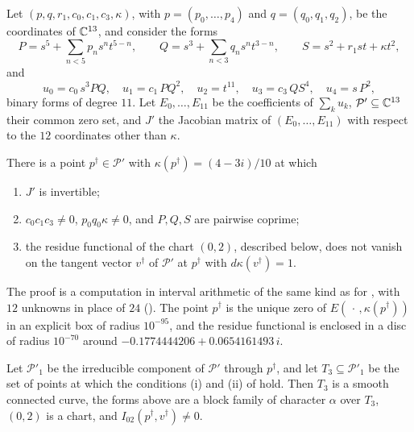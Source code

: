 Let $(p,q,r_{1},c_{0},c_{1},c_{3},\kappa)$, with $p=(p_{0},\dots,p_{4})$ and
$q=(q_{0},q_{1},q_{2})$, be the coordinates of $\mathbb{C}^{13}$, and consider the
forms
\[
  P=s^{5}+\sum_{n<5}p_{n}s^{n}t^{5-n},\qquad Q=s^{3}+\sum_{n<3}q_{n}s^{n}
  t^{3-n},\qquad S=s^{2}+r_{1}st+\kappa t^{2},
\]
and
\[
  u_{0}=c_{0}\,s^{3}PQ,\quad u_{1}=c_{1}\,PQ^{2},\quad u_{2}=t^{11},\quad
  u_{3}=c_{3}\,QS^{4},\quad u_{4}=s\,P^{2},
\]
binary forms of degree $11$. Let $E_{0},\dots,E_{11}$ be the coefficients
of $\sum_{k}u_{k}$, $\mathcal P'\subseteq\mathbb{C}^{13}$ their common zero set, and
$J'$ the Jacobian matrix of $(E_{0},\dots,E_{11})$ with respect to the $12$
coordinates other than $\kappa$.

\begin{proposition}\label{prop:family44}
There is a point $p^{\dagger}\in\mathcal P'$ with $\kappa(p^{\dagger})=
(4-3i)/10$ at which
\begin{enumerate}[label=\textup{(\roman*)}]
\item $J'$ is invertible;
\item $c_{0}c_{1}c_{3}\ne0$, $p_{0}q_{0}\kappa\ne0$, and $P,Q,S$ are
pairwise coprime;
\item the residue functional of the chart $(0,2)$, described below, does not
vanish on the tangent vector $v^{\dagger}$ of $\mathcal P'$ at $p^{\dagger}$
with $d\kappa(v^{\dagger})=1$.
\end{enumerate}
\end{proposition}

The proof is a computation in interval arithmetic of the same kind as for
, with $12$ unknowns in place of $24$
(). The point $p^{\dagger}$ is the unique zero of
$E(\,\cdot\,,\kappa(p^{\dagger}))$ in an explicit box of radius $10^{-95}$,
and the residue functional is enclosed in a disc of radius $10^{-70}$ around
$-0.1774444206+0.0654161493\,i$.

\begin{corollary}\label{cor:family44}
Let $\mathcal P'_{1}$ be the irreducible component of $\mathcal P'$ through
$p^{\dagger}$, and let $T_{3}\subseteq\mathcal P'_{1}$ be the set of points
at which the conditions \textup{(i)} and \textup{(ii)} of
 hold. Then $T_{3}$ is a smooth connected curve, the
forms above are a block family of character $\alpha$ over $T_{3}$, $(0,2)$
is a chart, and $I_{02}(p^{\dagger},v^{\dagger})\ne0$.
\end{corollary}

